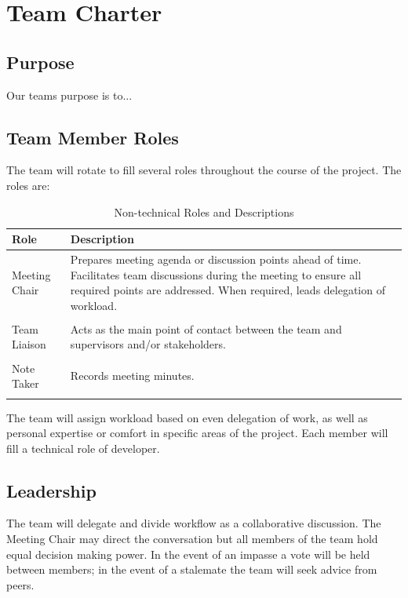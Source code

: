 \documentclass{article}
\begin{document}
\medskip

\newpage
\section{Team Charter}
\subsection{Purpose}

Our teams purpose is to...\\

\subsection{Team Member Roles}

The team will rotate to fill several roles throughout the course of the project. The roles are: 

\begin{table}[ht]
\centering
\caption{Non-technical Roles and Descriptions}
\label{tab:non-technical-roles}
\begin{tabularx}{\textwidth}{lX}
\toprule
\textbf{Role} & \textbf{Description} \\
\midrule

Meeting Chair & Prepares meeting agenda or discussion points ahead of time. Facilitates team discussions during the meeting to ensure all required points are addressed. When required, leads delegation of workload.  \\ \\
Team Liaison & Acts as the main point of contact between the team and supervisors and/or stakeholders.  \\ \\
Note Taker & Records meeting minutes. \\ \\
\bottomrule
\end{tabularx}
\end{table}

The team will assign workload based on even delegation of work, as well as personal expertise or comfort in specific areas of the project. Each member will fill a technical role of developer. \\

\subsection{Leadership}

The team will delegate and divide workflow as a collaborative discussion. The Meeting Chair may direct the conversation but all members of the team hold equal decision making power. In the event of an impasse a vote will be held between members; in the event of a stalemate the team will seek advice from peers. \\
\end{document}
